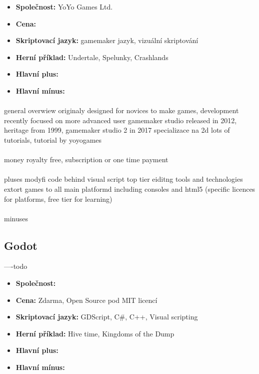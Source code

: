 \begin{itemize}
	\item \textbf{Společnost: } YoYo Games Ltd.
	\item \textbf{Cena: }
	\item \textbf{Skriptovací jazyk: } gamemaker jazyk, vizuální skriptování
	\item \textbf{Herní příklad: } Undertale, Spelunky, Crashlands
	\item \textbf{Hlavní plus: }
	\item \textbf{Hlavní mínus: }
\end{itemize}

\paragraph{}
	general overwiew
	originaly designed for novices to make games, development recently focused on more advanced user
	gamemaker studio released in 2012, heritage from 1999, gamemaker studio 2 in 2017
	specializace na 2d
	lots of tutorials, tutorial by yoyogames

\paragraph{}
	money
 	royalty free, subscription or one time payment

\paragraph{}
	pluses
	modyfi code behind visual script
	top tier eiditng tools and technologies
	extort games to all main platformd including consoles and html5 (specific licences for platforms, free tier for learning)

\paragraph{}
	minuses


\subsection{Godot}
----todo \linebreak
{}

\begin{itemize}
	\item \textbf{Společnost: }
	\item \textbf{Cena: } Zdarma,  Open Source pod MIT licencí
	\item \textbf{Skriptovací jazyk: } GDScript, C\#, C++, Visual scripting
	\item \textbf{Herní příklad: } Hive time, Kingdoms of the Dump
	\item \textbf{Hlavní plus: }
	\item \textbf{Hlavní mínus: }
\end{itemize}


